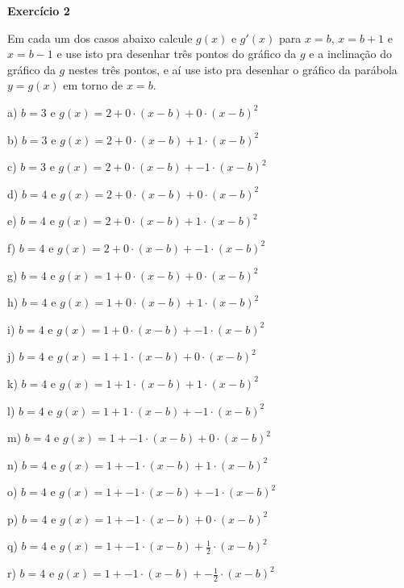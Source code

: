 \documentclass[oneside,12pt]{article}
\begin{document}
\newpage


{\bf Exercício 2}

\ssk

Em cada um dos casos abaixo calcule $g(x)$ e $g'(x)$ para $x=b$,
$x=b+1$ e $x=b-1$ e use isto pra desenhar três pontos do gráfico da
$g$ e a inclinação do gráfico da $g$ nestes três pontos, e aí use isto
pra desenhar o gráfico da parábola $y=g(x)$ em torno de $x=b$.

\msk

a) $b=3$ e $g(x) = 2 + 0·(x-b) + 0·(x-b)^2$

b) $b=3$ e $g(x) = 2 + 0·(x-b) + 1·(x-b)^2$

c) $b=3$ e $g(x) = 2 + 0·(x-b) + -1·(x-b)^2$

\ssk

d) $b=4$ e $g(x) = 2 + 0·(x-b) + 0·(x-b)^2$

e) $b=4$ e $g(x) = 2 + 0·(x-b) + 1·(x-b)^2$

f) $b=4$ e $g(x) = 2 + 0·(x-b) + -1·(x-b)^2$

\ssk

g) $b=4$ e $g(x) = 1 + 0·(x-b) + 0·(x-b)^2$

h) $b=4$ e $g(x) = 1 + 0·(x-b) + 1·(x-b)^2$

i) $b=4$ e $g(x) = 1 + 0·(x-b) + -1·(x-b)^2$

\newpage

j) $b=4$ e $g(x) = 1 + 1·(x-b) + 0·(x-b)^2$

k) $b=4$ e $g(x) = 1 + 1·(x-b) + 1·(x-b)^2$

l) $b=4$ e $g(x) = 1 + 1·(x-b) + -1·(x-b)^2$

\ssk

m) $b=4$ e $g(x) = 1 + -1·(x-b) + 0·(x-b)^2$

n) $b=4$ e $g(x) = 1 + -1·(x-b) + 1·(x-b)^2$

o) $b=4$ e $g(x) = 1 + -1·(x-b) + -1·(x-b)^2$

\ssk

p) $b=4$ e $g(x) = 1 + -1·(x-b) + 0·(x-b)^2$

q) $b=4$ e $g(x) = 1 + -1·(x-b) + \frac12·(x-b)^2$

r) $b=4$ e $g(x) = 1 + -1·(x-b) + -\frac12·(x-b)^2$





\end{document}
